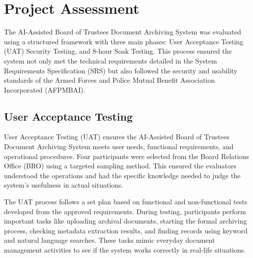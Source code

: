 
\section{Project Assessment}
The AI-Assisted Board of Trustees Document Archiving System was evaluated using a structured framework with three main phases: User Acceptance Testing (UAT) Security Testing, and 8-hour Soak Testing. This process ensured the system not only met the technical requirements detailed in the System Requirements Specification (SRS) but also followed the security and usability standards of the Armed Forces and Police Mutual Benefit Association Incorporated (AFPMBAI).
    \subsection{User Acceptance Testing}

User Acceptance Testing (UAT) ensures the AI-Assisted Board of Trustees Document Archiving System meets user needs, functional requirements, and operational procedures. Four participants were selected from the Board Relations Office (BRO) using a targeted sampling method. This ensured the evaluators understood the operations and had the specific knowledge needed to judge the system's usefulness in actual situations.

The UAT process follows a set plan based on functional and non-functional tests developed from the approved requirements. During testing, participants perform important tasks like uploading archival documents, starting the formal archiving process, checking metadata extraction results, and finding records using keyword and natural language searches. These tasks mimic everyday document management activities to see if the system works correctly in real-life situations.


